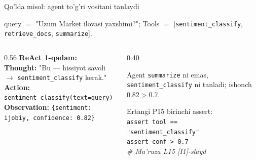 \documentclass[aspectratio=169,11pt]{beamer}
\begin{document}
%
\begin{frame}{Qo'lda misol: agent to'g'ri vositani tanlaydi}
  \begin{tcolorbox}[defbox,title={Berilgan: so'rov va vositalar}]
    \small query $=$ "Uzum Market ilovasi yaxshimi?"; \;
    Tools $=$ [\texttt{sentiment\_classify}, \texttt{retrieve\_docs}, \texttt{summarize}].
  \end{tcolorbox}
  \vspace{0.2em}
  \begin{columns}[T]
    \begin{column}{0.56\textwidth}
      \textbf{ReAct 1-qadam:}\\[2pt]
      \footnotesize
      \textbf{Thought:} "Bu --- hissiyot savoli $\to$ \texttt{sentiment\_classify} kerak."\\
      \textbf{Action:} \texttt{sentiment\_classify(text=query)}\\
      \textbf{Observation:} \texttt{\{sentiment: ijobiy, confidence: 0.82\}}
    \end{column}
    \begin{column}{0.40\textwidth}
      \begin{tcolorbox}[okbox,top=2pt,bottom=2pt]
        \footnotesize
        Agent \texttt{summarize} ni emas, \texttt{sentiment\_classify} ni
        tanladi; ishonch $0.82 > 0.7$.
      \end{tcolorbox}
      \vspace{3pt}
      \footnotesize\color{halfgray}
      Ertangi P15 birinchi assert:\\
      \texttt{assert tool == }\\
      \texttt{\phantom{xx}"sentiment\_classify"}\\
      \texttt{assert conf > 0.7}\\
      \textit{\# Ma'ruza L15 [I1]-slayd}
    \end{column}
  \end{columns}
\end{frame}
\end{document}
